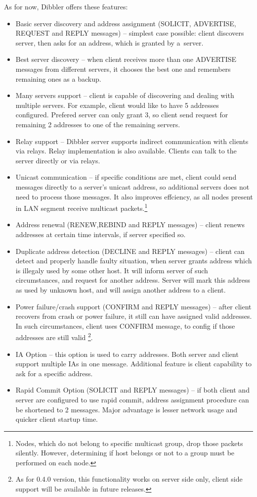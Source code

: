 As for now, Dibbler offers these features:
\begin{itemize}
\item Basic server discovery and address assignment (SOLICIT,
  ADVERTISE, REQUEST and REPLY messages) -- simplest case possible:
  client discovers server, then asks for an address, which is granted
  by a~server.
\item Best server discovery -- when client receives more than one
  ADVERTISE messages from different servers, it chooses the best one
  and remembers remaining ones as a backup.
\item Many servers support -- client is capable of discovering and
  dealing with multiple servers. For example, client would like to
  have 5 addresses configured. Prefered server can only grant 3, so
  client send request for remaining 2 addresses to one of the
  remaining servers.
\item Relay support -- Dibbler server supports indirect
  communication with clients via relays. Relay implementation is also
  available. Clients can talk to the server directly or via relays.
\item Unicast communication -- if specific conditions are met, client
  could send messages directly to a server's unicast address, so
  additional servers does not need to process those messages. It also
  improves effciency, as all nodes present in LAN segment receive
  multicast packets.\footnote{Nodes, which do not belong to specific
    multicast group, drop those packets silently. However, determining
    if host belongs or not to a group must be performed on each node.}
\item Address renewal (RENEW,REBIND and REPLY messages) -- client renews
  addresses at certain time intervals, if server specified so.
\item Duplicate address detection (DECLINE and REPLY messages) -- client
  can detect and properly handle faulty situation, when server grants
  address which is illegaly used by some other host. It will inform
  server of such circumstances, and request for another
  address. Server will mark this address as used by unknown host, and
  will assign another address to a client.
\item Power failure/crash support (CONFIRM and REPLY messages) -- after
  client recovers from crash or power failure, it still can have
  assigned valid addresses. In such circumstances, client uses CONFIRM
  message, to config if those addresses are still valid%
  \footnote{As for 0.4.0 version, this functionality works on server side only,
  client side support will be available in future releases.}.
\item IA Option -- this option is used to carry addresses. Both server
  and client support multiple IAs in one message. Additional feature
  is client capability to ask for a specific address.
\item Rapid Commit Option (SOLICIT and REPLY messages) -- if both
  client and server are configured to use rapid commit, address
  assignment procedure can be shortened to 2 messages. Major
  advantage is lesser network usage and quicker client startup time.
\end{itemize}

